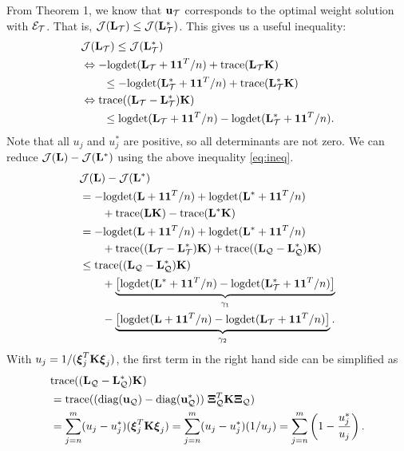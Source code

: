 \documentclass{article}
\begin{document}
From Theorem 1, we know that ${\bf u}_{\cal T}$ corresponds to the optimal weight solution with ${\cal E}_{\cal T}$. That is, ${\cal J}({\bf L}_{\cal T})\leq{\cal J}({\bf L}_{\cal T}^*)$. This gives us a useful inequality: 
\begin{align}
\label{eq:ineq}
  & {\cal J}({\bf L}_{\cal T})\leq{\cal J}({\bf L}_{\cal T}^*) \nonumber\\
  & \Leftrightarrow -\text{logdet}({\bf L}_{\cal T}+{\bf 1}{\bf 1}^T/n)+\text{trace}({\bf L}_{\cal T}{\bf K}) \nonumber\\
  & \qquad \leq -\text{logdet}({\bf L}_{\cal T}^*+{\bf 1}{\bf 1}^T/n)+\text{trace}({\bf L}_{\cal T}^*{\bf K}) \nonumber\\
  & \Leftrightarrow \text{trace}(({\bf L}_{\cal T}-{\bf L}_{\cal T}^*){\bf K}) \nonumber\\
  & \qquad \leq \text{logdet}({\bf L}_{\cal T}+{\bf 1}{\bf 1}^T/n)-\text{logdet}({\bf L}_{\cal T}^*+{\bf 1}{\bf 1}^T/n).
\end{align}
Note that all $u_j$ and $u_j^*$ are positive, so all determinants are not zero. 
We can reduce ${\cal J}({\bf L})-{\cal J}({\bf L}^*)$ using the above inequality \eqref{eq:ineq}.
\begin{align}
  & {\cal J}({\bf L})-{\cal J}({\bf L}^*) \nonumber\\
  & = -\text{logdet}({\bf L}+{\bf 1}{\bf 1}^T/n) + \text{logdet}({\bf L}^*+{\bf 1}{\bf 1}^T/n) \nonumber\\
  &\qquad +\text{trace}({\bf L}{\bf K})-\text{trace}({\bf L}^*{\bf K}) \nonumber\\
  &= -\text{logdet}({\bf L}+{\bf 1}{\bf 1}^T/n) + \text{logdet}({\bf L}^*+{\bf 1}{\bf 1}^T/n) \nonumber\\
  &\qquad +\text{trace}(({\bf L}_{\cal T}-{\bf L}_{\cal T}^*){\bf K}) + \text{trace}(({\bf L}_{\cal Q}-{\bf L}_{\cal Q}^*){\bf K}) \nonumber\\
\label{eq:reduced}
  &\leq \text{trace}(({\bf L}_{\cal Q}-{\bf L}_{\cal Q}^*){\bf K}) \nonumber\\
  &\qquad +\underbrace{\left[\text{logdet}({\bf L}^*+{\bf 1}{\bf 1}^T/n)-\text{logdet}({\bf L}_{\cal T}^*+{\bf 1}{\bf 1}^T/n)\right]}_{\gamma_1} \nonumber\\
  &\qquad -\underbrace{\left[\text{logdet}({\bf L}+{\bf 1}{\bf 1}^T/n)- \text{logdet}({\bf L}_{\cal T}+{\bf 1}{\bf 1}^T/n)\right]}_{\gamma_2}.
\end{align}
With $u_j=1/(\hbox{\boldmath$\xi$}_j^T{\bf K}\hbox{\boldmath$\xi$}_j)$, the first term in the right hand side can be simplified as
\begin{align}
  &\text{trace}(({\bf L}_{\cal Q}-{\bf L}_{\cal Q}^*){\bf K}) \nonumber\\
  &= \text{trace}((\text{diag}({\bf u}_{\cal Q})-\text{diag}({\bf u}_{\cal Q}^*))\;\hbox{\boldmath$\Xi$}_{\cal Q}^T{\bf K}\hbox{\boldmath$\Xi$}_{\cal Q}) \nonumber \\
\label{eq:trace_reduce}
  &= \sum_{j=n}^m (u_j-u_j^*)(\hbox{\boldmath$\xi$}_j^T{\bf K}\hbox{\boldmath$\xi$}_j)
  = \sum_{j=n}^m (u_j-u_j^*)(1/u_j)
  = \sum_{j=n}^m \left(1-\frac{u_j^*}{u_j}\right).
\end{align}
\end{document}
